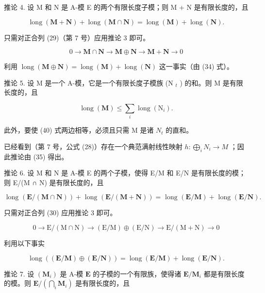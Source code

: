 推论 4. 设 M 和 N 是 A-模 E 的两个有限长度子模；则 M + N 是有限长度的，且

\[
\operatorname{long} (\mathbf {M} + \mathbf {N}) + \operatorname{long} (\mathbf {M} \cap \mathbf {N}) = \operatorname{long} (\mathbf {M}) + \operatorname{long} (\mathbf {N}).\tag{39}
\]

只需对正合列 (29)（第 7 号）应用推论 3 即可。

\[
0 \rightarrow \mathbf {M} \cap \mathbf {N} \rightarrow \mathbf {M} \oplus \mathbf {N} \rightarrow \mathbf {M} + \mathbf {N} \rightarrow 0
\]

利用 \(\operatorname{long}(\mathbf{M} \oplus \mathbf{N}) = \operatorname{long}(\mathbf{M}) + \operatorname{long}(\mathbf{N})\) 这一事实（由 (34) 式）。

推论 5. 设 M 是一个 A-模，它是一个有限长度子模族 (N \(_{t}\) ) 的和。则 M 是有限长度的，且

\[
\operatorname{long} (\mathbf {M}) \leqslant \sum_ {i} \operatorname{long} \left(\mathrm{N} _ {i}\right).\tag{40}
\]

此外，要使 (40) 式两边相等，必须且只需 M 是诸 \(N_{t}\) 的直和。

已经看到（第 7 号，公式 (28)）存在一个典范满射线性映射 \(h \colon \bigoplus_{i} N_{i} \to M\) ；因此推论由 (35) 得出。

推论 6. 设 M 和 N 是 A-模 E 的两个子模，使得 E/M 和 E/N 是有限长度的模；则 E/(M ∩ N) 是有限长度的，且

\[
\text { long } (\mathbf {E} / (\mathbf {M} \cap \mathbf {N})) + \text { long } (\mathbf {E} / (\mathbf {M} + \mathbf {N})) = \text { long } (\mathbf {E} / \mathbf {M}) + \text { long } (\mathbf {E} / \mathbf {N}). \tag {41}
\]

只需对正合列 (30) 应用推论 3 即可。

\[
0 \rightarrow \mathrm{E} / (\mathrm{M} \cap \mathrm{N}) \rightarrow (\mathrm{E} / \mathrm{M}) \oplus (\mathrm{E} / \mathrm{N}) \rightarrow \mathrm{E} / (\mathrm{M} + \mathrm{N}) \rightarrow 0
\]

利用以下事实

\[
\operatorname{long} ((\mathbf {E} / \mathbf {M}) \oplus (\mathbf {E} / \mathbf {N})) = \operatorname{long} (\mathbf {E} / \mathbf {M}) + \operatorname{long} (\mathbf {E} / \mathbf {N}).
\]

推论 7. 设 \((\mathbf{M}_i)\) 是 A-模 \(\mathbf{E}\) 的子模的一个有限族，使得诸 \(\mathbf{E} / \mathbf{M}_i\) 都是有限长度的模。则 \(\mathbf{E} / (\bigcap_{i} \mathbf{M}_i)\) 是有限长度的，且

